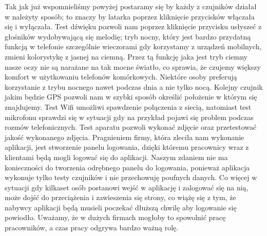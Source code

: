 Tak jak już wspomnieliśmy powyżej postaramy się by każdy z czujników działał w należyty sposób; to znaczy by latarka poprzez kliknięcie przycisków włączała się i wyłączała. Test dźwięku pozwoli nam poprzez kliknięcie przycisku usłyszeć z głośników wydobywającą się melodię; tryb nocny, który jest bardzo przydatną funkcją w telefonie szczególnie wieczorami gdy korzystamy z urządzeń mobilnych, zmieni kolorystykę z jasnej na ciemną. Przez tą funkcję jaka jest tryb ciemny nasze oczy nie są narażane na tak mocne światło, co sprawia, że czujemy większy komfort w użytkowaniu telefonów komórkowych. Niektóre osoby preferują korzystanie z trybu nocnego nawet podczas dnia a nie tylko nocą. Kolejny czujnik jakim będzie GPS pozwoli nam w szybki sposób określić położenie w którym się znajdujemy. Test Wifi umożliwi spawdzenie połączenia z siecią, natomiast test mikrofonu sprawdzi się w sytuacji gdy na przykład pojawi się problem podczas rozmów telefonicznych. Test aparatu pozwoli wykonać zdjęcie oraz przetestować jakość wykonanego zdjęcia.  \newline
Pragnieniem firmy, która zleciła nam wykonanie aplikacji, jest stworzenie panelu logowania, dzięki któremu pracownicy wraz z klientami będą mogli logować się do aplikacji. Naszym zdaniem nie ma konieczności do tworzenia odrębnego panelu do logowania, ponieważ aplikacja wykonuje tylko testy czujników i nie przechowuję poufnych danych. Co więcej w sytuacji gdy kilkaset osób postanowi wejść w aplikację i zalogować się na nią, może dojść do przeciążenia i zawieszenia się strony, co wiążę się z tym, że nabywcy aplikacji będą musieli poczekać dłuższą chwilę aby logowanie się powiodło. Uważamy, że w dużych firmach mogłoby to spowolnić pracę pracowników, a czas pracy odgrywa bardzo ważną rolę.\newline

